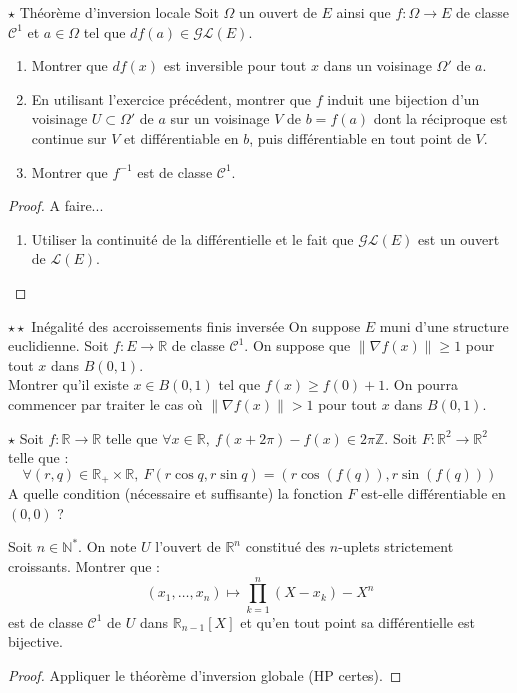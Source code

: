 \documentclass[french,a4paper]{article}
\newcommand{\N}{\mathbb{N}}
\newcommand{\Z}{\mathbb{Z}}
\newcommand{\R}{\mathbb{R}}
\newcommand{\st}{^*}
\newcommand{\inv}{^{-1}}
\theoremstyle{plain}
\theoremstyle{definition}
\theoremstyle{remark}
\begin{document}
\begin{ex}[Moulin.CD.18]{$\star$ Théorème d'inversion locale}
	Soit $\Omega$ un ouvert de $E$ ainsi que $f:\Omega\to E$ de classe $\mathcal{C}^1$ et $a\in\Omega$ tel que $df(a)\in\mathcal{GL}(E)$.
	\begin{enumerate}
		\item Montrer que $df(x)$ est inversible pour tout $x$ dans un voisinage $\Omega'$ de $a$.
		\item En utilisant l'exercice précédent, montrer que $f$ induit une bijection d'un voisinage $U\subset\Omega'$ de $a$ sur un voisinage $V$ de $b=f(a)$ dont la réciproque est continue sur $V$ et différentiable en $b$, puis différentiable en tout point de $V$.
		\item Montrer que $f\inv$ est de classe $\mathcal{C}^1$.
	\end{enumerate}
\end{ex}
\begin{proof}
	A faire...
	\begin{enumerate}
		\item Utiliser la continuité de la différentielle et le fait que $\mathcal{GL}(E)$ est un ouvert de $\mathcal{L}(E)$.
	\end{enumerate}
\end{proof}

\begin{ex}[Moulin.CD.19]{$\star\star$ Inégalité des accroissements finis inversée}
	On suppose $E$ muni d'une structure euclidienne. Soit $f:E\to\R$ de classe $\mathcal{C}^1$. On suppose que $\lVert\nabla f(x)\rVert\geqslant 1$ pour tout $x$ dans $B(0,1)$. \\
	Montrer qu'il existe $x\in B(0,1)$ tel que $f(x)\geqslant f(0)+1$. On pourra commencer par traiter le cas où $\lVert\nabla f(x)\rVert>1$ pour tout $x$ dans $B(0,1)$.
\end{ex}

\begin{ex}[Moulin.CD.20 / X]{$\star$}
	Soit $f:\R\to\R$ telle que $\forall x\in\R,\ f(x+2\pi)-f(x)\in 2\pi\Z$. Soit $F:\R^2\to\R^2$ telle que : $$\forall (r,q)\in\R_+\times\R,\ F(r\cos q,r\sin q)=(r\cos(f(q)),r\sin(f(q)))$$ A quelle condition (nécessaire et suffisante) la fonction $F$ est-elle différentiable en $(0,0)$ ?
\end{ex}

\begin{ex}[Moulin.CD.21]{}
	Soit $n\in\N\st$. On note $U$ l'ouvert de $\R^n$ constitué des $n$-uplets strictement croissants. Montrer que : $$(x_1,\ldots,x_n)\mapsto\prod_{k=1}^{n}(X-x_k)-X^n$$ est de classe $\mathcal{C}^1$ de $U$ dans $\R_{n-1}[X]$ et qu'en tout point sa différentielle est bijective.
\end{ex}
\begin{proof}
	Appliquer le théorème d'inversion globale (HP certes).
\end{proof}
\end{document}
